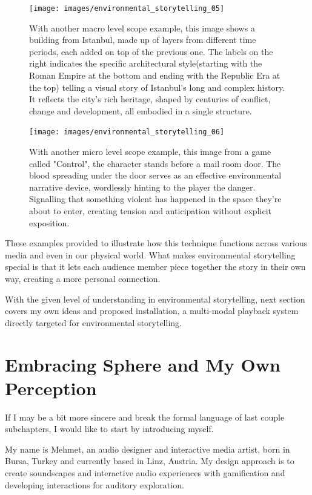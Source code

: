     \begin{figure}[H]
    \centering
    \texttt{[image: images/environmental\_storytelling\_05]}
    \caption{With another macro level scope example, this image shows a building from Istanbul, made up of layers from different time periods, each added on top of the previous one. The labels on the right indicates the specific architectural style(starting with the Roman Empire at the bottom and ending with the Republic Era at the top) telling a visual story of Istanbul’s long and complex history. It reflects the city’s rich heritage, shaped by centuries of conflict, change and development, all embodied in a single structure.}
    \end{figure}

    \begin{figure}[H]
    \centering
    \texttt{[image: images/environmental\_storytelling\_06]}
    \caption{With another micro level scope example, this image from a game called "Control", the character stands before a mail room door. The blood spreading under the door serves as an effective environmental narrative device, wordlessly hinting to the player the danger. Signalling that something violent has happened in the space they're about to enter, creating tension and anticipation without explicit exposition.}
    \end{figure}

    These examples provided to illustrate how this technique functions across various media and even in our physical world. What makes environmental storytelling special is that it lets each audience member piece together the story in their own way, creating a more personal connection.\par

    With the given level of understanding in environmental storytelling, next section covers my own ideas and proposed installation, a multi-modal playback system directly targeted for environmental storytelling.\par
    \section{Embracing Sphere and My Own Perception} 
    If I may be a bit more sincere and break the formal language of last couple subchapters, I would like to start by introducing myself.\par 
    
    My name is Mehmet, an audio designer and interactive media artist, born in Bursa, Turkey and currently based in Linz, Austria. My design approach is to create soundscapes and interactive audio experiences with gamification and developing interactions for auditory exploration.\par


